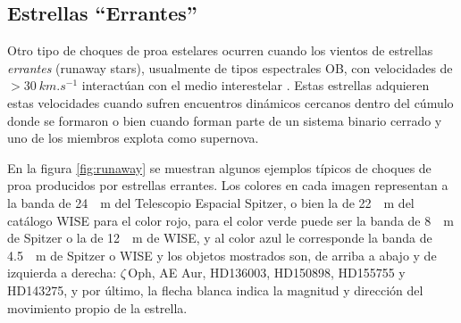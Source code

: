 \subsection{Estrellas ``Errantes''}

Otro tipo de choques de proa estelares ocurren cuando los vientos de estrellas \textit{errantes} (runaway stars), usualmente de tipos espectrales OB, con velocidades de $ >\SI{30}{km.s^{-1}}$ interactúan con el medio interestelar \citep{Kobulnicky:2016}. Estas estrellas adquieren estas velocidades cuando sufren encuentros dinámicos cercanos dentro del cúmulo donde se formaron o bien cuando forman parte de un sistema binario cerrado y uno de los miembros explota como supernova.

En la figura \ref{fig:runaway} se muestran algunos ejemplos típicos de choques de proa producidos por estrellas errantes. Los colores en cada imagen representan a la banda de \SI{24}{\mu.m} del Telescopio Espacial Spitzer, o bien la de \SI{22}{\mu.m} del catálogo WISE para el color rojo, para el color verde puede ser la banda de \SI{8}{\mu.m} de Spitzer o la de \SI{12}{\mu.m} de WISE, y al color azul le corresponde la banda de \SI{4.5}{\mu.m} de Spitzer o WISE y los objetos mostrados son, de arriba a abajo y de izquierda a derecha: $\zeta$\,Oph, AE Aur, HD136003, HD150898, HD155755 y HD143275, y por último, la flecha blanca indica la magnitud y dirección del movimiento propio de la estrella.

